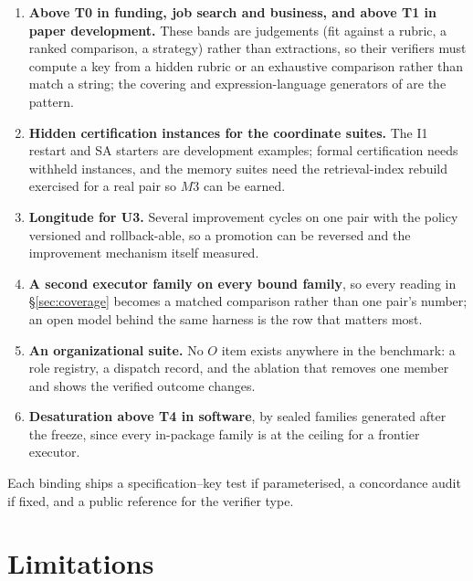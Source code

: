 \begin{enumerate}[leftmargin=*]
\item \textbf{Above T0 in funding, job search and business, and above T1 in paper development.} These bands are judgements (fit against a rubric, a ranked comparison, a strategy) rather than extractions, so their verifiers must compute a key from a hidden rubric or an exhaustive comparison rather than match a string; the covering and expression-language generators of \citet{yang2026unified} are the pattern.
\item \textbf{Hidden certification instances for the coordinate suites.} The I1 restart and SA starters are development examples; formal certification needs withheld instances, and the memory suites need the retrieval-index rebuild exercised for a real pair so $M3$ can be earned.
\item \textbf{Longitude for U3.} Several improvement cycles on one pair with the policy versioned and rollback-able, so a promotion can be reversed and the improvement mechanism itself measured.
\item \textbf{A second executor family on every bound family}, so every reading in \S\ref{sec:coverage} becomes a matched comparison rather than one pair's number; an open model behind the same harness is the row that matters most.
\item \textbf{An organizational suite.} No $O$ item exists anywhere in the benchmark: a role registry, a dispatch record, and the ablation that removes one member and shows the verified outcome changes.
\item \textbf{Desaturation above T4 in software}, by sealed families generated after the freeze, since every in-package family is at the ceiling for a frontier executor.
\end{enumerate}

Each binding ships a specification--key test if parameterised, a concordance audit if fixed, and a public reference for the verifier type.

\section{Limitations}\label{sec:limits}

